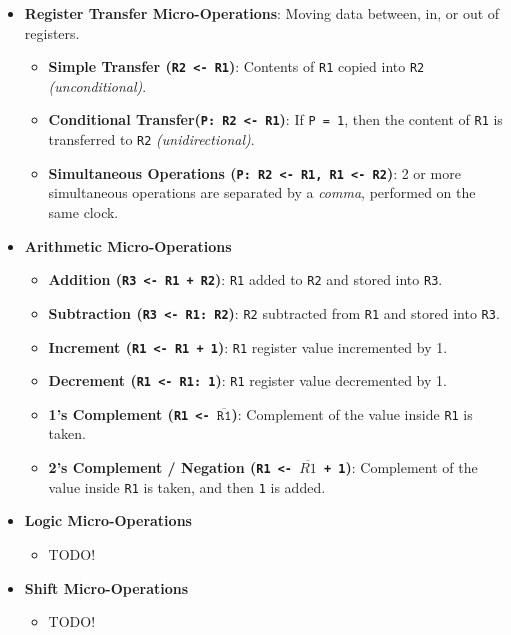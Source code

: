 \documentclass[12pt, letterpaper]{article}
\begin{document}
\begin{itemize}
    \item \textbf{Register Transfer Micro-Operations}: Moving data between, in, or out of registers.
        \begin{itemize}
            \item \textbf{Simple Transfer (\texttt{R2 <- R1})}: Contents of \texttt{R1} copied into \texttt{R2} \textit{(unconditional)}.
            \item \textbf{Conditional Transfer(\texttt{P: R2 <- R1})}: If \texttt{P = 1}, then the  content of \texttt{R1} is transferred to \texttt{R2} \textit{(unidirectional)}.
            \item \textbf{Simultaneous Operations (\texttt{P: R2 <- R1, R1 <- R2})}: 2 or more simultaneous operations are separated by a \textit{comma}, performed on the same clock.
        \end{itemize}
    \item \textbf{Arithmetic Micro-Operations}
        \begin{itemize}
            \item \textbf{Addition (\texttt{R3 <- R1 + R2})}: \texttt{R1} added to \texttt{R2} and stored into \texttt{R3}.
            \item \textbf{Subtraction (\texttt{R3 <- R1: R2})}: \texttt{R2} subtracted from \texttt{R1} and stored into \texttt{R3}.
            \item \textbf{Increment (\texttt{R1 <- R1 + 1})}: \texttt{R1} register value incremented by 1.
            \item \textbf{Decrement (\texttt{R1 <- R1: 1})}: \texttt{R1} register value decremented by 1.
            \item \textbf{1's Complement (\texttt{R1 <- $ \overline{\texttt{R1}} $})}: Complement of the value inside \texttt{R1} is taken.
            \item \textbf{2's Complement / Negation (\texttt{R1 <- $ \overline{R1} $ + 1})}: Complement of the value inside \texttt{R1} is taken, and then \texttt{1} is added.
        \end{itemize}
    \item \textbf{Logic Micro-Operations}
        \begin{itemize}
            \item TODO!
        \end{itemize}
    \item \textbf{Shift Micro-Operations}
        \begin{itemize}
            \item TODO!
        \end{itemize}
\end{itemize}
\end{document}
